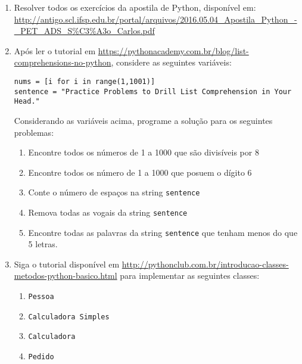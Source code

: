 \documentclass{article}
\begin{document}
\begin{enumerate}
    \item Resolver todos os exercícios da apostila de Python, disponível em: \url{http://antigo.scl.ifsp.edu.br/portal/arquivos/2016.05.04_Apostila_Python_-_PET_ADS_S%C3%A3o_Carlos.pdf}
    \item Após ler o tutorial em \url{https://pythonacademy.com.br/blog/list-comprehensions-no-python}, considere as seguintes variáveis:
    
    \texttt{nums = [i for i in range(1,1001)]}\\
    \texttt{sentence = "Practice Problems to Drill List Comprehension in Your Head."}
    
    Considerando as variáveis acima, programe a solução para os seguintes problemas:
    
    \begin{enumerate}
    \item Encontre todos os números de 1 a 1000 que são divisíveis por 8
    \item Encontre todos os número de 1 a 1000 que posuem o dígito 6
    \item Conte o número de espaços na string \texttt{sentence}
    \item Remova todas as vogais da string \texttt{sentence}
    \item Encontre todas as palavras da string \texttt{sentence} que tenham menos do que 5 letras.
    \end{enumerate}
    
    \item Siga o tutorial disponível em \url{http://pythonclub.com.br/introducao-classes-metodos-python-basico.html} para implementar as seguintes classes:
    \begin{enumerate}
        \item \texttt{Pessoa}
        \item \texttt{Calculadora Simples}
        \item \texttt{Calculadora}
        \item \texttt{Pedido}
    \end{enumerate}
    

\end{enumerate}

%
%
\end{document}
